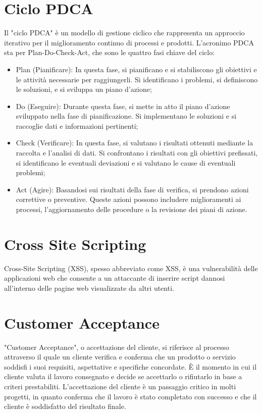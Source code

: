 \documentclass{article}
\begin{document}
\section{Ciclo PDCA}
 Il "ciclo PDCA" è un modello di gestione ciclico che rappresenta un approccio iterativo per il miglioramento continuo di processi e prodotti. L'acronimo PDCA sta per Plan-Do-Check-Act, che sono le quattro fasi chiave del ciclo:
\begin{itemize}
    \item Plan (Pianificare): In questa fase, si pianificano e si stabiliscono gli obiettivi e le attività necessarie per raggiungerli. Si identificano i problemi, si definiscono le soluzioni, e si sviluppa un piano d'azione;
    \item Do (Eseguire): Durante questa fase, si mette in atto il piano d'azione sviluppato nella fase di pianificazione. Si implementano le soluzioni e si raccoglie dati e informazioni pertinenti;
    \item Check (Verificare): In questa fase, si valutano i risultati ottenuti mediante la raccolta e l'analisi di dati. Si confrontano i risultati con gli obiettivi prefissati, si identificano le eventuali deviazioni e si valutano le cause di eventuali problemi;
    \item Act (Agire): Basandosi sui risultati della fase di verifica, si prendono azioni correttive o preventive. Queste azioni possono includere miglioramenti ai processi, l'aggiornamento delle procedure o la revisione dei piani di azione.
\end{itemize}

\section{Cross Site Scripting}
Cross-Site Scripting (XSS), spesso abbreviato come XSS, è una vulnerabilità delle applicazioni web che consente a un attaccante di inserire script dannosi all'interno delle pagine web visualizzate da altri utenti.

\section{Customer Acceptance}
"Customer Acceptance", o accettazione del cliente, si riferisce al processo attraverso il quale un cliente verifica e conferma che un prodotto o servizio soddisfi i suoi requisiti, aspettative e specifiche concordate. È il momento in cui il cliente valuta il lavoro consegnato e decide se accettarlo o rifiutarlo in base a criteri prestabiliti. L'accettazione del cliente è un passaggio critico in molti progetti, in quanto conferma che il lavoro è stato completato con successo e che il cliente è soddisfatto del risultato finale.
\end{document}
